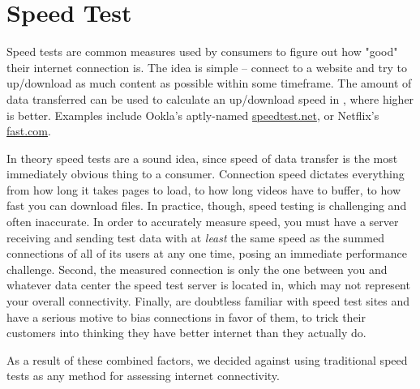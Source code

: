 \section{Speed Test}\label{sec:speed_test_background}

Speed tests are common measures used by consumers to figure out how "good" their internet connection is. The idea is simple -- connect to a website and try to up/download as much content as possible within some timeframe. The amount of data transferred can be used to calculate an up/download speed in \Mbps, where higher is better. Examples include Ookla's aptly-named \url{speedtest.net}, or Netflix's \url{fast.com}.

In theory speed tests are a sound idea, since speed of data transfer is the most immediately obvious thing to a consumer. Connection speed dictates everything from how long it takes pages to load, to how long videos have to buffer, to how fast you can download files. In practice, though, speed testing is challenging and often inaccurate. In order to accurately measure speed, you must have a server receiving and sending test data with at \textit{least} the same speed as the summed connections of all of its users at any one time, posing an immediate performance challenge. Second, the measured connection is only the one between you and whatever data center the speed test server is located in, which may not represent your overall connectivity. Finally, \isps are doubtless familiar with speed test sites and have a serious motive to bias connections in favor of them, to trick their customers into thinking they have better internet than they actually do.

As a result of these combined factors, we decided against using traditional speed tests as any method for assessing internet connectivity.
